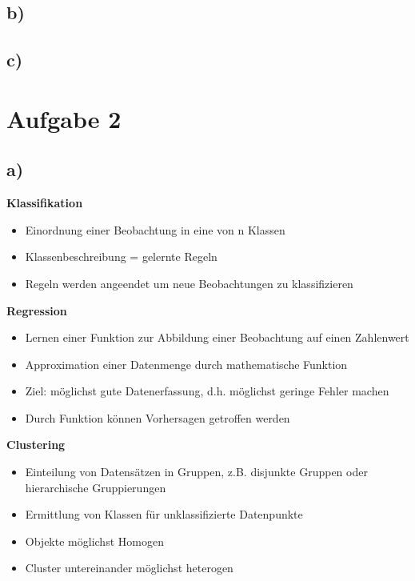 \documentclass[11pt,a4paper,parskip=half ]{scrartcl}
\begin{document}
	\subsection*{b)}
	
	
	\subsection*{c)}
	
	
	\section*{Aufgabe 2}
	\subsection*{a)}
	
	\textbf{Klassifikation}\\
	\begin{itemize}
		\item Einordnung einer Beobachtung in eine von n Klassen
		\item Klassenbeschreibung = gelernte Regeln
		\item Regeln werden angeendet um neue Beobachtungen zu klassifizieren
	\end{itemize}
	
	\textbf{Regression}\\
	\begin{itemize}
		\item Lernen einer Funktion zur Abbildung einer Beobachtung auf einen Zahlenwert
		\item Approximation einer Datenmenge durch mathematische Funktion
		\item Ziel: möglichst gute Datenerfassung, d.h. möglichst geringe Fehler machen
		\item Durch Funktion können Vorhersagen getroffen werden
	\end{itemize}
	
	\textbf{Clustering}\\
	\begin{itemize}
		\item Einteilung von Datensätzen in Gruppen, z.B. disjunkte Gruppen oder hierarchische Gruppierungen
		\item Ermittlung von Klassen für unklassifizierte Datenpunkte
		\item Objekte möglichst Homogen
		\item Cluster untereinander möglichst heterogen
	\end{itemize}
	
\end{document}
